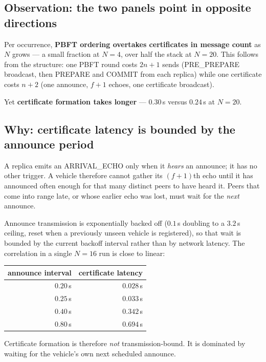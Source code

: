 \documentclass[11pt,a4paper]{article}
\begin{document}
\subsection*{Observation: the two panels point in opposite directions}

Per occurrence, \textbf{PBFT ordering overtakes certificates in message count}
as $N$ grows --- a small fraction at $N{=}4$, over half the stack at $N{=}20$.
This follows from the structure: one PBFT round costs $2n{+}1$ sends
(PRE\_PREPARE broadcast, then PREPARE and COMMIT from each replica) while one
certificate costs $n{+}2$ (one announce, $f{+}1$ echoes, one certificate
broadcast).

Yet \textbf{certificate formation takes longer} --- $0.30$\,s versus $0.24$\,s
at $N{=}20$.

\subsection*{Why: certificate latency is bounded by the announce period}

A replica emits an ARRIVAL\_ECHO only when it \emph{hears} an announce; it has
no other trigger. A vehicle therefore cannot gather its $(f{+}1)$th echo until it
has announced often enough for that many distinct peers to have heard it. Peers
that come into range late, or whose earlier echo was lost, must wait for the
\emph{next} announce.

Announce transmission is exponentially backed off ($0.1$\,s doubling to a
$3.2$\,s ceiling, reset when a previously unseen vehicle is registered), so that
wait is bounded by the current backoff interval rather than by network latency.
The correlation in a single $N{=}16$ run is close to linear:

\begin{center}
\begin{tabular}{rr}
\toprule
announce interval & certificate latency \\
\midrule
$0.20$\,s & $0.028$\,s \\
$0.25$\,s & $0.033$\,s \\
$0.40$\,s & $0.342$\,s \\
$0.80$\,s & $0.694$\,s \\
\bottomrule
\end{tabular}
\end{center}

\noindent
Certificate formation is therefore \emph{not} transmission-bound. It is
dominated by waiting for the vehicle's own next scheduled announce.
\end{document}
